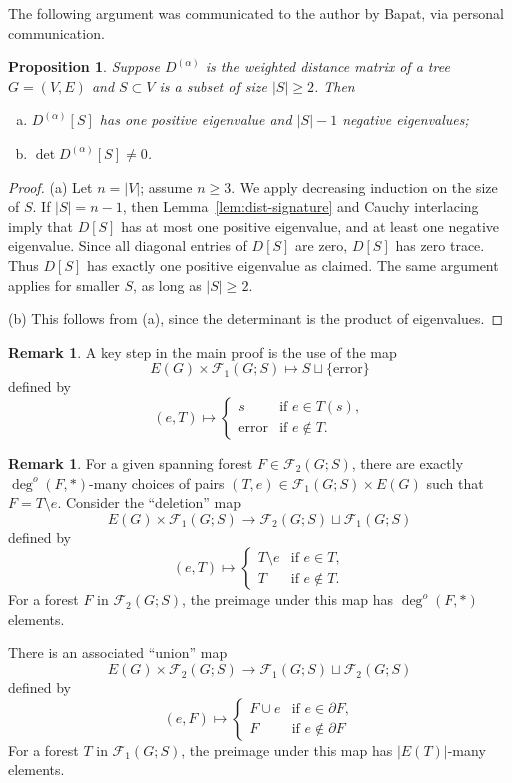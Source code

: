 \documentclass{amsart}
\newtheorem{prop}[thm]{Proposition}
\theoremstyle{definition}
\newtheorem{rmk}[thm]{Remark}
\newcommand{\Da}{{D^{(\alpha)}}}
\newcommand{\trees}{\mathcal{F}_1}
\newcommand{\forests}{\mathcal{F}}
\newcommand{\degout}{\deg^o}
\begin{document}
The following argument was communicated to the author by Bapat, via personal communication.
\begin{prop}
\label{prop:distance-sub-nonsingular}
Suppose $\Da$ is the weighted distance matrix of a tree $G = (V,E)$ and $S \subset V$ is a subset of size $|S| \geq 2$. 
Then
\begin{enumerate}[(a)]
\item $\Da[S]$ has one positive eigenvalue and $|S| - 1$ negative eigenvalues;

\item $\det \Da[S] \neq 0$.

\end{enumerate}
\end{prop}
\begin{proof}
(a) Let $n = |V|$; assume $n \geq 3$.
We apply decreasing induction on the size of $S$. 
If $|S| = n - 1$, then Lemma~\ref{lem:dist-signature} and Cauchy interlacing imply that $D[S]$ has at most one positive eigenvalue, and at least one negative eigenvalue. 
Since all diagonal entries of $D[S]$ are zero, $D[S]$ has zero trace. 
Thus $D[S]$ has exactly one positive eigenvalue as claimed.
The same argument applies for smaller $S$, as long as $|S| \geq 2$.

(b) This follows from (a), since the determinant is the product of eigenvalues.
\end{proof}


\begin{rmk}
A key step in the main proof is the use of the map
\[
	E(G) \times \trees(G;S) \mapsto S \sqcup \{\text{error}\}
\]
defined by
\[
	(e, T) \mapsto \begin{cases}
		s &\text{if } e \in T(s), \\
		\text{error} &\text{if } e \not\in T .
	\end{cases}
\]
\end{rmk}

\begin{rmk}
For a given spanning forest
$F \in \forests_2(G;S)$,
there are exactly $\degout(F, *)$-many choices of pairs $(T,e) \in \trees(G;S) \times E(G)$ such that
$F = T \setminus e.$
Consider the ``deletion'' map
\[
	E(G) \times \trees(G;S) \to \forests_2(G;S) \sqcup \trees(G;S)
\]
defined by
\[
	(e, T) \mapsto \begin{cases}
	T \setminus e &\text{if } e\in T,\\
	T &\text{if } e\not\in T.
	\end{cases}
\]
For a forest $F$ in $\forests_2(G;S)$,
the preimage under this map has $\degout(F,*)$ elements.

There is an associated ``union'' map 
\[
	E(G) \times \forests_2(G;S) \longrightarrow \trees(G;S) \sqcup \forests_2(G;S)
\]
defined by
\[
	(e, F) \mapsto \begin{cases}
		F \cup e &\text{if } e \in \partial F, \\
		F &\text{if } e \not\in \partial F
	\end{cases}
\]
For a forest $T$ in $\trees(G; S)$, the preimage under this map has $|E(T)|$-many elements.
\end{rmk}
\end{document}
